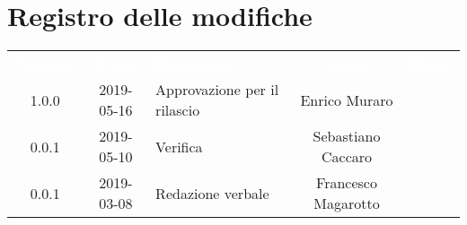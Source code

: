 \section*{Registro delle modifiche}
{
	\renewcommand{\arraystretch}{1.5}
	\centering
	\begin{longtable}{ c c  C{4cm}  c  c }
		
		\textcolor{white}{\textbf{Versione}} & \textcolor{white}{\textbf{Data}} & \textcolor{white}{\textbf{Descrizione}} & \textcolor{white}{\textbf{Autore}} & \textcolor{white}{\textbf{Ruolo}}\\
		1.0.0 & 2019-05-16 & Approvazione per il rilascio & Enrico Muraro & \Res{}\\
		0.0.1 & 2019-05-10 & Verifica & Sebastiano Caccaro & \ver{}\\
		0.0.1 & 2019-03-08 & Redazione verbale & Francesco Magarotto & \reda{}\\
		
		
	\end{longtable}
	
}